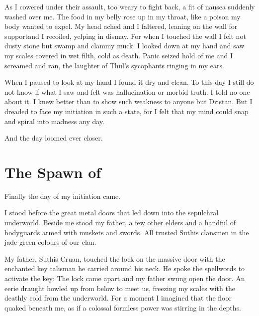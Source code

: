 \documentclass
  [a4paper,
   12pt,
   oneside
  ]%
  {article}
\begin{document}
As I cowered under their assault, too weary to fight back, a fit of nausea suddenly washed over me. 
The food in my belly rose up in my throat, like a poison my body wanted to expel. 
My head ached and I faltered, leaning on the wall for support\dash and I recoiled, yelping in dismay. 
For when I touched the wall I felt not dusty stone but swamp and clammy muck. 
I looked down at my hand and saw my scales covered in wet filth, cold as death. 
Panic seized hold of me and I screamed and ran, the laughter of Thul's sycophants ringing in my ears. 

When I paused to look at my hand I found it dry and clean.
To this day I still do not know if what I saw and felt was hallucination or morbid truth. 
I told no one about it. 
I knew better than to show such weakness to anyone but Dristan. 
But I dreaded to face my initiation in such a state, for I felt that my mind could snap and spiral into madness any day. 

And the day loomed ever closer. 















\section{The Spawn of \Dragons}
Finally the day of my initiation came. 

I stood before the great metal doors that led down into the sepulchral underworld.
Beside me stood my father, a few other elders and a handful of bodyguards armed with muskets and swords.
All trusted Suthis clansmen in the jade-green colours of our clan. 



My father, Suthis Cruan, touched the lock on the massive door with the enchanted key talisman he carried around his neck.
He spoke the \Draconic spellwords to activate the key: 
The lock came apart and my father swung open the door. 
An eerie draught howled up from below to meet us, freezing my scales with the deathly cold from the underworld. 
For a moment I imagined that the floor quaked beneath me, as if a colossal formless power was stirring in the depths. 
\end{document}
